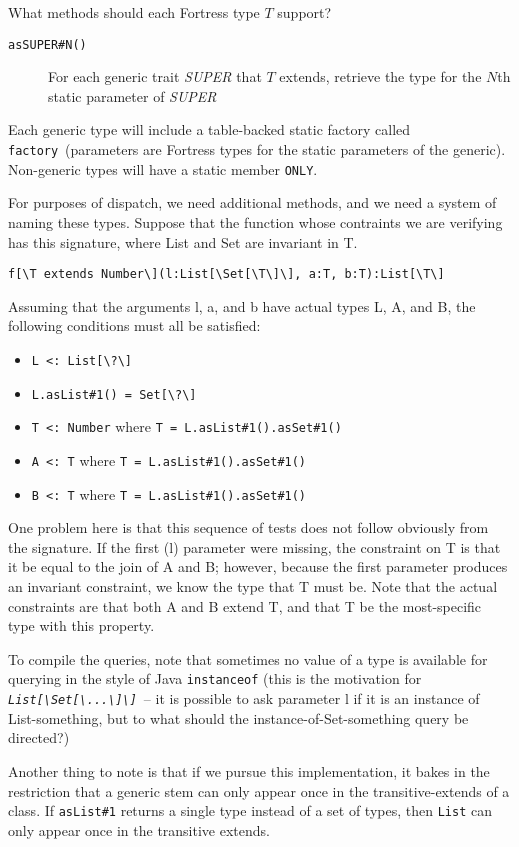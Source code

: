 \documentclass[11pt]{article}
\makeatletter
\newcommand{\jvm}[1]{{\tt #1}}
\newcommand{\ftt}[1]{{\tt\slshape{#1}}}
\def\BS{\textbackslash}
\newcommand{\slantverbatim}{\def\verbatim@font{\slshape\ttfamily\hyphenchar\font\m@ne\@noligs}}
\makeatother
\begin{document}
What methods should each Fortress type $T$ support?
\begin{description}
\item[\jvm{asSUPER\#N()}] For each generic trait {\it SUPER} that $T$ extends, retrieve the type for the $N$th static parameter of {\it SUPER} 
\end{description}
Each generic type will include a table-backed static factory called \verb+factory+\ (parameters are Fortress types for the static parameters of the generic).  Non-generic types will have a static member \verb+ONLY+.  

For purposes of dispatch, we need additional methods, and we need a system of naming these types.  Suppose that the function whose contraints we are verifying has this signature, where List and Set are invariant in T.
{\slantverbatim
\begin{verbatim}
f[\T extends Number\](l:List[\Set[\T\]\], a:T, b:T):List[\T\]
\end{verbatim}
}
Assuming that the arguments l, a, and b have actual types L, A, and B, the following conditions must all be satisfied:
\begin{itemize}
\item \verb+L <: List[\?\]+
\item \verb+L.asList#1() = Set[\?\]+
\item \verb+T <: Number+ where \verb+T = L.asList#1().asSet#1()+
\item \verb+A <: T+ where \verb+T = L.asList#1().asSet#1()+
\item \verb+B <: T+ where \verb+T = L.asList#1().asSet#1()+
\end{itemize}
One problem here is that this sequence of tests does not follow obviously from the signature.
If the first (l) parameter were missing, the constraint on T is that it be equal to the join of A and B; however, because the first parameter produces an invariant constraint, we know the type that T must be.  Note that the actual constraints are that both A and B extend T, and that T be the most-specific type with this property.

To compile the queries, note that sometimes no value of a type is available for querying in the style of Java \verb+instanceof+ (this is the motivation for \ftt{List[\BS Set[\BS ...\BS]\BS]}\ -- it is possible to ask parameter l if it is an instance of List-something, but to what should the instance-of-Set-something query be directed?)

Another thing to note is that if we pursue this implementation, it bakes in the restriction that a generic stem can only appear once in the transitive-extends of a class.  If \jvm{asList\#1} returns a single type instead of a set of types, then \jvm{List} can only appear once in the transitive extends.
\end{document}
